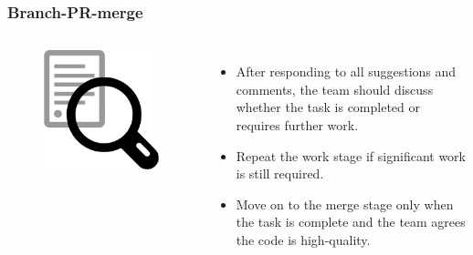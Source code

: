 \documentclass[aspectratio=169]{beamer}
\begin{document}
\begin{frame}
	\frametitle{Branch-PR-merge }
	\begin{columns}[c]

		\begin{figure}
			\centering
			\includegraphics[width=.6\textwidth]{./img/qa.png}
		\end{figure}

		\begin{itemize}
			\setlength\itemsep{1em}
			\item After responding to all suggestions and comments, 
   the team should discuss whether the task is completed or requires further work.
			\item Repeat the work stage 
			if significant work is still required.
			\item Move on to the merge stage 
			only when the task is complete and 
			the team agrees the code is high-quality.
		\end{itemize}

	\end{columns}
\end{frame}
\end{document}
